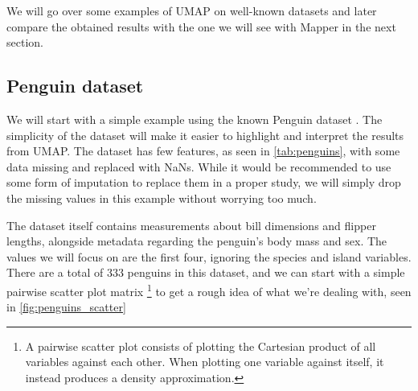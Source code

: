 We will go over some examples of UMAP on well-known datasets and later compare the obtained results with the one we will see with Mapper in the next section.

\subsection{Penguin dataset}
We will start with a simple example using the known Penguin dataset \cite{10.1371/journal.pone.0090081}. The simplicity of the dataset will make it easier to highlight and interpret the results from UMAP. The dataset has few features, as seen in \ref{tab:penguins}, with some data missing and replaced with NaNs. While it would be recommended to use some form of imputation to replace them in a proper study, we will simply drop the missing values in this example without worrying too much.

The dataset itself contains measurements about bill dimensions and flipper lengths, alongside metadata regarding the penguin's body mass and sex. The values we will focus on are the first four, ignoring the species and island variables. There are a total of 333 penguins in this dataset, and we can start with a simple pairwise scatter plot matrix \footnote{A pairwise scatter plot consists of plotting the Cartesian product of all variables against each other. When plotting one variable against itself, it instead produces a density approximation.} to get a rough idea of what we're dealing with, seen in \ref{fig:penguins_scatter}


